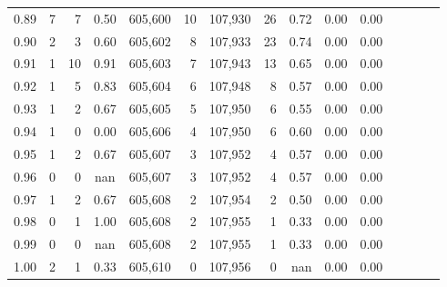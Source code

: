 \begin{tabular}{rrrcrrrrrrrrrrr}
0.89 &       7 &      7 &                                       0.50 &  605,600 &       10 &  107,930 &       26 &  0.72 &  0.00 &                         0.00 \\
0.90 &       2 &      3 &                                       0.60 &  605,602 &        8 &  107,933 &       23 &  0.74 &  0.00 &                         0.00 \\
0.91 &       1 &     10 &                                       0.91 &  605,603 &        7 &  107,943 &       13 &  0.65 &  0.00 &                         0.00 \\
0.92 &       1 &      5 &                                       0.83 &  605,604 &        6 &  107,948 &        8 &  0.57 &  0.00 &                         0.00 \\
0.93 &       1 &      2 &                                       0.67 &  605,605 &        5 &  107,950 &        6 &  0.55 &  0.00 &                         0.00 \\
0.94 &       1 &      0 &                                       0.00 &  605,606 &        4 &  107,950 &        6 &  0.60 &  0.00 &                         0.00 \\
0.95 &       1 &      2 &                                       0.67 &  605,607 &        3 &  107,952 &        4 &  0.57 &  0.00 &                         0.00 \\
0.96 &       0 &      0 &                                        nan &  605,607 &        3 &  107,952 &        4 &  0.57 &  0.00 &                         0.00 \\
0.97 &       1 &      2 &                                       0.67 &  605,608 &        2 &  107,954 &        2 &  0.50 &  0.00 &                         0.00 \\
0.98 &       0 &      1 &                                       1.00 &  605,608 &        2 &  107,955 &        1 &  0.33 &  0.00 &                         0.00 \\
0.99 &       0 &      0 &                                        nan &  605,608 &        2 &  107,955 &        1 &  0.33 &  0.00 &                         0.00 \\
1.00 &       2 &      1 &                                       0.33 &  605,610 &        0 &  107,956 &        0 &   nan &  0.00 &                         0.00 \\
\bottomrule
\end{tabular}
